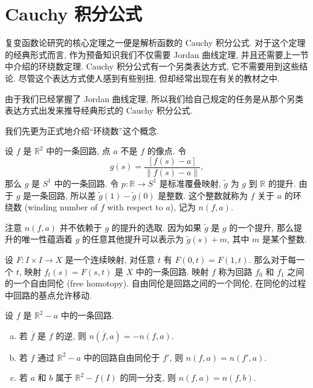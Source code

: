 \section{Cauchy 积分公式}\label{ch10:section-cauchy}

复变函数论研究的核心定理之一便是解析函数的 Cauchy 积分公式. 对于这个定理的经典形式而言, 作为预备知识我们不仅需要 Jordan 曲线定理, 并且还需要上一节中介绍的环绕数定理. Cauchy 积分公式有一个另类表达方式, 它不需要用到这些结论. 尽管这个表达方式使人感到有些别扭, 但却经常出现在有关的教材之中.

由于我们已经掌握了 Jordan 曲线定理, 所以我们给自己规定的任务是从那个另类表达方式出发来推导经典形式的 Cauchy 积分公式.

我们先更为正式地介绍``环绕数''这个概念.

\begin{definition}\label{ch10:def-winding-number}
设 $f$ 是 $\mathbb{R}^{2}$ 中的一条回路, 点 $a$ 不是 $f$ 的像点. 令
\[
g(s)=\frac{[f(s)-a]}{\|f(s)-a\|},
\]
那么 $g$ 是 $S^{1}$ 中的一条回路. 令 $p\colon\mathbb{R}\to S^{1}$ 是标准覆叠映射, $\widetilde{g}$ 为 $g$ 到 $\mathbb{R}$ 的提升. 由于 $g$ 是一条回路, 所以差 $\widetilde{g}(1)-\widetilde{g}(0)$ 是整数. 这个整数就称为 $f$ 关于 $a$ 的环绕数 (winding number of $f$ with respect to $a$), 记为 $n(f,a)$.
\end{definition}

注意 $n(f,a)$ 并不依赖于 $g$ 的提升的选取. 因为如果 $\widetilde{g}$ 是 $g$ 的一个提升, 那么提升的唯一性蕴涵着 $g$ 的任意其他提升可以表示为 $\widetilde{g}(s)+m$, 其中 $m$ 是某个整数.

\begin{definition}\label{ch10:def-free-homotopy}
设 $F\colon I\times I\to X$ 是一个连续映射, 对任意 $t$ 有 $F(0,t)=F(1,t)$. 那么对于每一个 $t$, 映射 $f_{t}(s)=F(s,t)$ 是 $X$ 中的一条回路. 映射 $f$ 称为回路 $f_{0}$ 和 $f_{1}$ 之间的一个自由同伦 (free homotopy). 自由同伦是回路之间的一个同伦, 在同伦的过程中回路的基点允许移动.
\end{definition}

\begin{lemma}\label{ch10:lemma-winding-properties}
设 $f$ 是 $\mathbb{R}^{2}-a$ 中的一条回路.

\begin{enumerate}[(a)]
\item 若 $\overline{f}$ 是 $f$ 的逆, 则 $n(\overline{f},a)=-n(f,a)$.
\item 若 $f$ 通过 $\mathbb{R}^{2}-a$ 中的回路自由同伦于 $f'$, 则 $n(f,a)=n(f',a)$.
\item 若 $a$ 和 $b$ 属于 $\mathbb{R}^{2}-f(I)$ 的同一分支, 则 $n(f,a)=n(f,b)$.
\end{enumerate}
\end{lemma}


